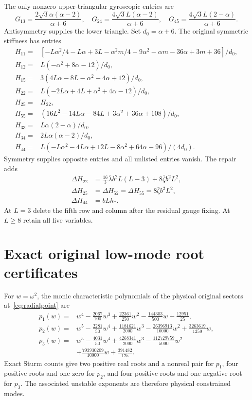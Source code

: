 \documentclass[11pt]{article}
\numberwithin{equation}{section}
\begin{document}
The only nonzero upper-triangular gyroscopic entries are
\begin{equation}
 G_{13}=\frac{2\sqrt3\alpha(\alpha-2)}{\alpha+6},\quad
 G_{24}=\frac{4\sqrt3L(\alpha-2)}{\alpha+6},\quad
 G_{45}=\frac{4\sqrt3L(2-\alpha)}{\alpha+6}.
\end{equation}
Antisymmetry supplies the lower triangle.
Set $d_0=\alpha+6$.
The original symmetric stiffness has entries
\begin{align}
 H_{11}={}&[-L\alpha^2/4-L\alpha+3L-\alpha^2m/4+9\alpha^2
 -\alpha m-36\alpha+3m+36]/d_0,\\
 H_{12}={}&L(-\alpha^2+8\alpha-12)/d_0,\\
 H_{15}={}&3(4L\alpha-8L-\alpha^2-4\alpha+12)/d_0,\\
 H_{22}={}&L(-2L\alpha+4L+\alpha^2+4\alpha-12)/d_0,\\
 H_{25}={}&H_{22},\\
 H_{55}={}&(16L^2-14L\alpha-84L+3\alpha^2+36\alpha+108)/d_0,\\
 H_{33}={}&L\alpha(2-\alpha)/d_0,\\
 H_{34}={}&2L\alpha(\alpha-2)/d_0,\\
 H_{44}={}&L(-L\alpha^2-4L\alpha+12L-8\alpha^2+64\alpha-96)/(4d_0).
\end{align}
Symmetry supplies opposite entries and all unlisted entries vanish.
The repair adds
\begin{align}
 \Delta H_{22}&=\tfrac{16}{3}\bar\lambda b^2L(L-3)+8\bar\zeta b^2L^2,\\
 \Delta H_{25}&=\Delta H_{52}=\Delta H_{55}=8\bar\zeta b^2L^2,\\
 \Delta H_{44}&=bLh_*.
\end{align}
At $L=3$ delete the fifth row and column after the residual gauge fixing.
At $L\ge8$ retain all five variables.

\section{Exact original low-mode root certificates}
\label{app:roots}

For $w=\omega^2$, the monic characteristic polynomials of the physical original sectors at~\eqref{eq:radialpoint} are
\begin{align}
 p_1(w)={}&w^4-\tfrac{2067}{100}w^3+\tfrac{22361}{250}w^2
 -\tfrac{144303}{500}w+\tfrac{12951}{25},\\
 p_2(w)={}&w^5-\tfrac{2281}{50}w^4+\tfrac{1181621}{2000}w^3
 -\tfrac{26396913}{10000}w^2+\tfrac{3263619}{1250}w,\\
 p_3(w)={}&w^5-\tfrac{4031}{50}w^4+\tfrac{4268341}{2000}w^3
 -\tfrac{112729759}{5000}w^2\nonumber\\
 &+\tfrac{793930209}{10000}w+\tfrac{391482}{125}.
\end{align}
Exact Sturm counts give two positive real roots and a nonreal pair for $p_1$, four positive roots and one zero for $p_2$, and four positive roots and one negative root for $p_3$.
The associated unstable exponents are therefore physical constrained modes.



\end{document}
